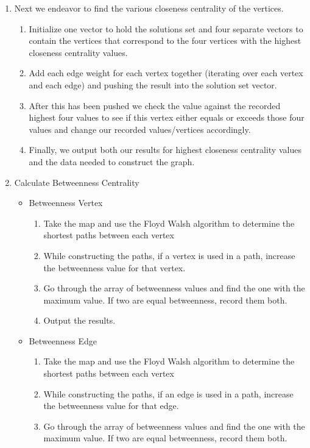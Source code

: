 \documentclass{article}
\begin{document}
\begin{enumerate}
    \item Next we endeavor to find the various closeness centrality of the vertices.
    \begin{enumerate}
        \item Initialize one vector to hold the solutions set and four separate vectors to contain the vertices that correspond to the four vertices with the highest closeness centrality values.
        \item Add each edge weight for each vertex together (iterating over each vertex and each edge) and pushing the result into the solution set vector.
        \item After this has been pushed we check the value against the recorded highest four values to see if this vertex either equals or exceeds those four values and change our recorded values/vertices accordingly.
        \item Finally, we output both our results for highest closeness centrality values and the data needed to construct the graph.
    \end{enumerate}

    \item Calculate Betweenness Centrality
    \begin{itemize}
        \item Betweenness Vertex
        \begin{enumerate}
            \item Take the map and use the Floyd Walsh algorithm to determine the shortest paths between each vertex
            \item While constructing the paths, if a vertex is used in a path, increase the betweenness value for that vertex.
            \item Go through the array of betweenness values and find the one with the maximum value. If two are equal betweenness, record them both.
            \item Output the results.
        \end{enumerate}

        \item Betweenness Edge
        \begin{enumerate}
            \item Take the map and use the Floyd Walsh algorithm to determine the shortest paths between each vertex
            \item While constructing the paths, if an edge is used in a path, increase the betweenness value for that edge.
            \item Go through the array of betweenness values and find the one with the maximum value. If two are equal betweenness, record them both.
        \end{enumerate}
    \end{itemize}


\end{enumerate}
\end{document}

